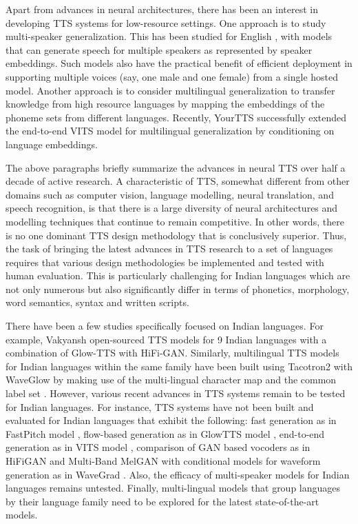 \documentclass{article}
\begin{document}
Apart from advances in neural architectures, there has been an interest in developing TTS systems for low-resource settings. 
One approach is to study multi-speaker generalization. 
This has been studied for English \cite{kim2020glow, lancucki2021fastpitch,  kim2021conditional}, with models that can generate speech for multiple speakers as represented by speaker embeddings.
Such models also have the practical benefit of efficient deployment in supporting multiple voices (say, one male and one female)  from a single hosted model.
Another approach is to consider multilingual generalization 
\cite{chen2019end} to transfer knowledge from high resource languages by mapping the embeddings of the phoneme sets from different languages. 
Recently, YourTTS \cite{casanova2022yourtts} successfully extended the end-to-end VITS model for multilingual generalization by conditioning on language embeddings. 

The above paragraphs briefly summarize the advances in neural TTS over half a decade of active research.
A characteristic of TTS, somewhat different from other domains such as computer vision, language modelling, neural translation, and speech recognition, is that there is a large diversity of neural architectures and modelling techniques that continue to remain competitive.
In other words, there is no one dominant TTS design methodology that is conclusively superior.
Thus, the task of bringing the latest advances in TTS research to a set of languages requires that various design methodologies be implemented and tested with human evaluation. 
This is particularly challenging for Indian languages which are not only numerous but also significantly differ in terms of phonetics, morphology, word semantics, syntax and written scripts.

There have been a few studies specifically focused on Indian languages.
For example, Vakyansh \cite{vakyansh2021glow} open-sourced TTS models for 9 Indian languages with a combination of Glow-TTS with HiFi-GAN.
Similarly, multilingual TTS models for Indian languages within the same family have been built \cite{prakash2020generic} using Tacotron2  with WaveGlow \cite{prenger2019waveglow} by making use of the multi-lingual character map \cite{prakash2019building} and the common label set \cite{baby2016unified}. 
However, various recent advances in TTS systems remain to be tested for Indian languages.
For instance, TTS systems have not been built and evaluated for Indian languages that exhibit the following: fast generation as in FastPitch model \cite{lancucki2021fastpitch}, flow-based generation as in GlowTTS model \cite{kim2020glow}, end-to-end generation as in VITS model \cite{kim2021conditional}, comparison of GAN based vocoders as in HiFiGAN \cite{kong2020hifi} and Multi-Band MelGAN\cite{yang2021multi}  with conditional models for waveform generation as in WaveGrad \cite{chen2020wavegrad}. 
Also, the efficacy of multi-speaker models for Indian languages remains untested. 
Finally, multi-lingual models that group languages by their language family need to be explored for the latest state-of-the-art models.
\end{document}
